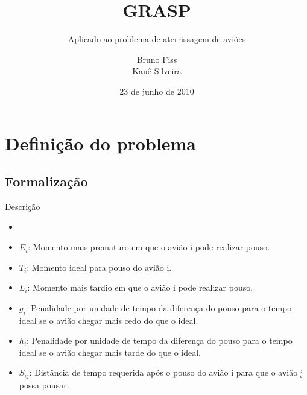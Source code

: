 \documentclass[xcolor=dvipsnames]{beamer}
\begin{document}
\title{GRASP}
\subtitle{Aplicado ao problema de aterrissagem de aviões}
\author{Bruno Fiss \\ Kauê Silveira}
\date[junho de 2010]{23 de junho de 2010}


\begin{frame}[plain]
  \titlepage
\end{frame}

\begin{frame}
  \tableofcontents
\end{frame}

\section{Definição do problema}

\subsection{Formalização}

\begin{frame}{Descrição}
  \begin{itemize}[<+-| alert@+>]
     \item{}
     \item{$ E_i$: Momento mais prematuro em que o avião i pode realizar pouso.}
     \item{$T_i$: Momento ideal para pouso do avião i.}
     \item{$L_i$: Momento mais tardio em que o avião i pode realizar pouso.}
     \item{$g_i$: Penalidade por unidade de tempo da diferença do pouso para o tempo ideal se o avião chegar mais cedo do que o ideal.}
     \item{$h_i$: Penalidade por unidade de tempo da diferença do pouso para o tempo ideal se o avião chegar mais tarde do que o ideal.}
     \item{$S_{ij}$: Distância de tempo requerida após o pouso do avião i para que o avião j possa pousar.}
  \end{itemize}
\end{frame}
\end{document}
